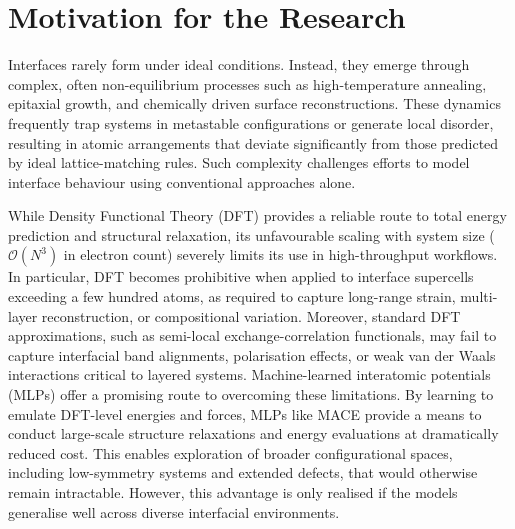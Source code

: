 \section{Motivation for the Research} \label{section:motivation}

Interfaces rarely form under ideal conditions. Instead, they emerge through complex, often non-equilibrium processes such as high-temperature annealing, epitaxial growth, and chemically driven surface reconstructions. These dynamics frequently trap systems in metastable configurations or generate local disorder, resulting in atomic arrangements that deviate significantly from those predicted by ideal lattice-matching rules. Such complexity challenges efforts to model interface behaviour using conventional approaches alone.

While Density Functional Theory (DFT) provides a reliable route to total energy prediction and structural relaxation, its unfavourable scaling with system size ($\mathcal{O}(N^3)$ in electron count) severely limits its use in high-throughput workflows. In particular, DFT becomes prohibitive when applied to interface supercells exceeding a few hundred atoms, as required to capture long-range strain, multi-layer reconstruction, or compositional variation. Moreover, standard DFT approximations, such as semi-local exchange-correlation functionals, may fail to capture interfacial band alignments, polarisation effects, or weak van der Waals interactions critical to layered systems.
Machine-learned interatomic potentials (MLPs) offer a promising route to overcoming these limitations. By learning to emulate DFT-level energies and forces, MLPs like MACE provide a means to conduct large-scale structure relaxations and energy evaluations at dramatically reduced cost. This enables exploration of broader configurational spaces, including low-symmetry systems and extended defects, that would otherwise remain intractable. However, this advantage is only realised if the models generalise well across diverse interfacial environments.

